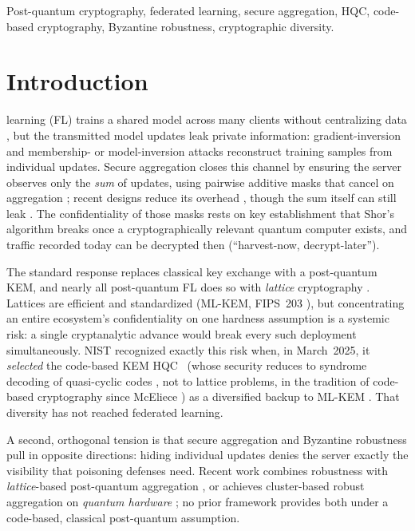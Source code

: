 \documentclass[lettersize,journal]{IEEEtran}
\begin{document}
\begin{IEEEkeywords}
Post-quantum cryptography, federated learning, secure aggregation, HQC, code-based
cryptography, Byzantine robustness, cryptographic diversity.
\end{IEEEkeywords}

\section{Introduction}
 learning (FL) trains a shared model across many clients without
centralizing data \cite{mcmahan2017,kairouz2021}, but the transmitted model updates leak private information:
gradient-inversion \cite{zhu2019,geiping2020} and membership- or model-inversion
\cite{shokri2017,fredrikson2015} attacks reconstruct training samples from
individual updates. Secure aggregation closes this channel by ensuring the server
observes only the \emph{sum} of updates, using pairwise additive masks that cancel on
aggregation \cite{bonawitz2017,bell2020}; recent designs reduce its overhead
\cite{lightsecagg,swiftagg}, though the sum itself can still leak
\cite{elkordy2022}. The confidentiality of those masks rests on key
establishment that Shor's algorithm \cite{shor1997} breaks once a cryptographically relevant quantum
computer exists, and traffic recorded today can be decrypted then
(``harvest-now, decrypt-later'').

The standard response replaces classical key exchange with a post-quantum KEM, and
nearly all post-quantum FL does so with \emph{lattice} cryptography
\cite{pqsf2024,qinxu2025,narsimhulu2026,nguyen2025lattice,byzpqfl2026}. Lattices are
efficient and standardized (ML-KEM, FIPS~203 \cite{fips203}), but concentrating an
entire ecosystem's confidentiality on one hardness assumption is a systemic risk: a
single cryptanalytic advance would break every such deployment simultaneously. NIST
recognized exactly this risk when, in March~2025, it \emph{selected} the code-based
KEM HQC~\cite{hqc} (whose security reduces to syndrome decoding of quasi-cyclic codes
\cite{macwilliams1977}, not to lattice problems, in the tradition of code-based
cryptography since McEliece \cite{mceliece1978}) as a diversified backup to ML-KEM
\cite{nistir8545}. That diversity has not reached federated learning.

A second, orthogonal tension is that secure aggregation and Byzantine robustness pull
in opposite directions: hiding individual updates denies the server exactly the
visibility that poisoning defenses need. Recent work combines robustness with
\emph{lattice}-based post-quantum aggregation \cite{byzpqfl2026}, or achieves
cluster-based robust aggregation on \emph{quantum hardware} \cite{cqsa2026}; no prior
framework provides both under a code-based, classical post-quantum assumption.
\end{document}
